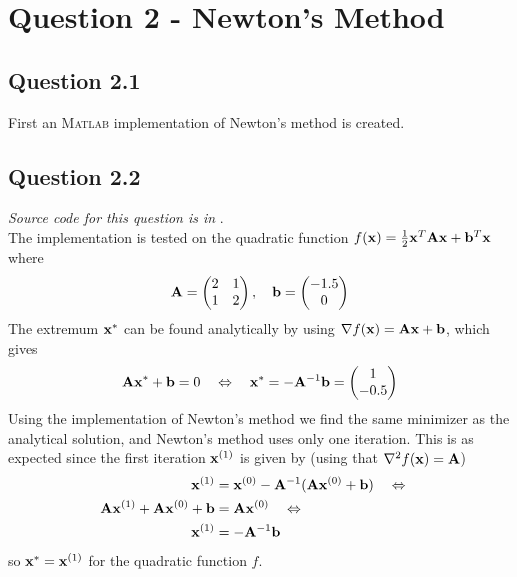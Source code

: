 \pagebreak

\section*{Question 2 - Newton's Method}
\subsection*{Question 2.1}
First an \textsc{Matlab} implementation of Newton's method is created.


\subsection*{Question 2.2}
\textit{Source code for this question is in }. \\
The implementation is tested on the quadratic function $f(\mathbf{x}) = \frac{1}{2}\mathbf{x}^T\mathbf{Ax} + \mathbf{b}^T\mathbf{x}$ where
\begin{equation*}
    \mathbf{A} = \begin{pmatrix}
        2 & 1 \\
        1 & 2
    \end{pmatrix}, \quad \mathbf{b} = \begin{pmatrix}
        -1.5 \\
        0
    \end{pmatrix}
\end{equation*}
The extremum $\mathbf{x}^*$ can be found analytically by using $\nabla f(\mathbf{x}) = \mathbf{Ax} + \mathbf{b}$, which gives
\begin{align*}
    \mathbf{Ax}^* + \mathbf{b} = 0 \quad\Leftrightarrow\quad
    \mathbf{x}^* = -\mathbf{A}^{-1}\mathbf{b} = \begin{pmatrix}
        1 \\
        -0.5
    \end{pmatrix}
\end{align*}
Using the implementation of Newton's method we find the same minimizer as the analytical solution, and Newton's method uses only one iteration. This is as expected since the first iteration $\mathbf{x}^{(1)}$ is given by (using that $\nabla^2 f(\mathbf{x}) = \mathbf{A}$)
\begin{align*}
    \mathbf{x}^{(1)} &= \mathbf{x}^{(0)} - \mathbf{A}^{-1}(\mathbf{A}\mathbf{x}^{(0)}+\mathbf{b}) \quad\Leftrightarrow\quad\\
    \mathbf{A}\mathbf{x}^{(1)} + \mathbf{A}\mathbf{x}^{(0)} + \mathbf{b} &= \mathbf{A}\mathbf{x}^{(0)} \quad\Leftrightarrow\quad\\
    \mathbf{x}^{(1)} &= -\mathbf{A}^{-1}\mathbf{b}
\end{align*}
so $\mathbf{x}^*=\mathbf{x}^{(1)}$ for the quadratic function $f$. 

